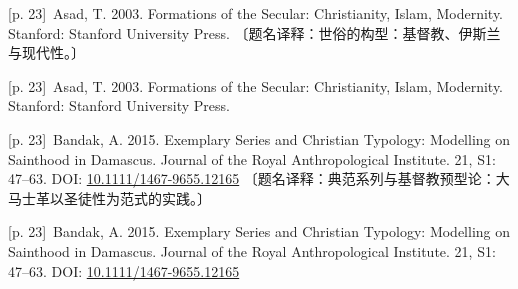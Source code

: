 \documentclass[10pt,a4paper]{article}
\begin{document}
\noindent\begin{minipage}{\textwidth}\begin{minipage}[t]{\dimexpr.5\textwidth-4mm\relax}\noindent\begin{minipage}[t]{\linewidth}{\scriptsize\color{gray} [p. 23]}\ Asad, T. 2003. Formations of the Secular: Christianity, Islam, Modernity. Stanford: Stanford University Press. 〔题名译释：世俗的构型：基督教、伊斯兰与现代性。〕\par\end{minipage}\par\end{minipage}\hfill\begin{minipage}[t]{\dimexpr.5\textwidth-4mm\relax}\noindent\begin{minipage}[t]{\linewidth}{\scriptsize\color{gray} [p. 23]}\ Asad, T. 2003. Formations of the Secular: Christianity, Islam, Modernity. Stanford: Stanford University Press.\par\end{minipage}\par\end{minipage}\end{minipage}\par
\noindent\begin{minipage}{\textwidth}\begin{minipage}[t]{\dimexpr.5\textwidth-4mm\relax}\noindent\begin{minipage}[t]{\linewidth}{\scriptsize\color{gray} [p. 23]}\ Bandak, A. 2015. Exemplary Series and Christian Typology: Modelling on Sainthood in Damascus. Journal of the Royal Anthropological Institute. 21, S1: 47–63. DOI: \url{10.1111/1467-9655.12165} 〔题名译释：典范系列与基督教预型论：大马士革以圣徒性为范式的实践。〕\par\end{minipage}\par\end{minipage}\hfill\begin{minipage}[t]{\dimexpr.5\textwidth-4mm\relax}\noindent\begin{minipage}[t]{\linewidth}{\scriptsize\color{gray} [p. 23]}\ Bandak, A. 2015. Exemplary Series and Christian Typology: Modelling on Sainthood in Damascus. Journal of the Royal Anthropological Institute. 21, S1: 47–63. DOI: \url{10.1111/1467-9655.12165}\par\end{minipage}\par\end{minipage}\end{minipage}\par
\end{document}
